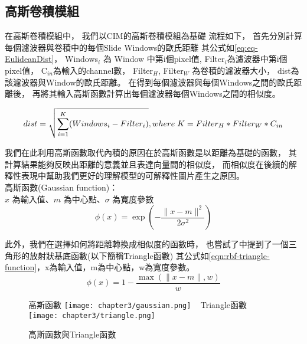 \documentclass[class=NCU_thesis, crop=false]{standalone}
\begin{document}
	\subsection{高斯卷積模組}
	在高斯卷積模組中，
	我們以CIM的高斯卷積模組為基礎
	流程如下，
	首先分別計算每個濾波器與卷積中的每個Slide Windows的歐氏距離
	其公式如\cref{eq:eq-EulideanDist}，
	Windows$_{i}$ 為 Window 中第i個pixel值, 
	Filter$_{i}$為濾波器中第i個pixel值，
	C$_{in}$為輸入的channel數，
	Filter$_{H}$, Filter$_{W}$ 為卷積的濾波器大小，
	dist為該濾波器與Window的歐氏距離。
	在得到每個濾波器與每個Windows之間的歐氏距離後，
	再將其輸入高斯函數計算出每個濾波器每個Windows之間的相似度。

	\begin{equation}
	    \label{eq:eq-EulideanDist}
	    dist = \sqrt{\sum_{i = 1}^{K} (Windows_{i} - Filter_{i})},\\ where \; K = Filter_{H} * Filter_{W} * C_{in}
	\end{equation}

		我們在此利用高斯函數取代內積的原因在於高斯函數是以距離為基礎的函數，
	其計算結果能夠反映出距離的意義並且表達向量間的相似度，
	而相似度在後續的解釋性表現中幫助我們更好的理解模型的可解釋性圖片產生之原因。\\
	高斯函數(Gaussian function)：\\
	  $x$ 為輸入值、$m$ 為中心點、$\sigma$ 為寬度參數
	  \begin{equation}
	      \label{eqn:rbf-gaussian-function}
	      \phi (x) = \exp \left( -\frac{\| x-m \|^2}{2\sigma ^2} \right) 
	  \end{equation}

  	此外，我們在選擇如何將距離轉換成相似度的函數時，
  	也嘗試了\cite{YangCNNInterpretable}中提到了一個三角形的放射狀基底函數(以下簡稱Triangle函數)
  	其公式如\cref{eqn:rbf-triangle-function}，x為輸入值，m為中心點，w為寬度參數。
  	\begin{equation}
      \label{eqn:rbf-triangle-function}
      \phi (x) = 1 - \frac{ \max \left( \| x-m \|, w \right)}{w}
  	\end{equation}

  	\begin{figure}[H]
    \centering
    \subcaptionbox
        {高斯函數
        \label{fig:gaussian}}
        {\texttt{[image: chapter3/gaussian.png]}}
    ~
    \subcaptionbox
        {Triangle函數
        \label{fig:triangle}}
        {\texttt{[image: chapter3/triangle.png]}}
    \caption{高斯函數與Triangle函數\cite{YangCNNInterpretable}}
    \label{fig:rbf}
	\end{figure}
\end{document}
